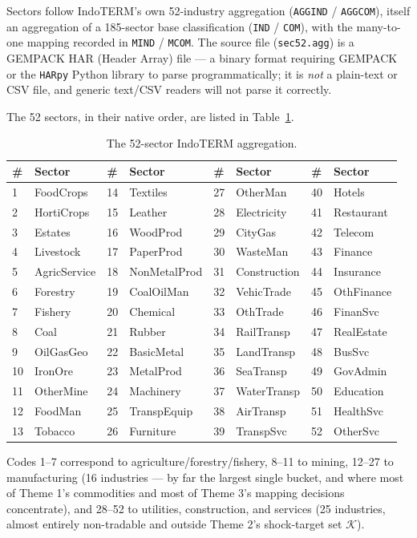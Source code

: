 \documentclass[11pt]{article}
\begin{document}
Sectors follow IndoTERM's own 52-industry aggregation (\texttt{AGGIND} /
\texttt{AGGCOM}), itself an aggregation of a 185-sector base classification
(\texttt{IND} / \texttt{COM}), with the many-to-one mapping recorded in
\texttt{MIND} / \texttt{MCOM}. The source file (\texttt{sec52.agg}) is a
GEMPACK HAR (Header Array) file --- a binary format requiring GEMPACK or the
\texttt{HARpy} Python library to parse programmatically; it is \emph{not} a
plain-text or CSV file, and generic text/CSV readers will not parse it
correctly.

The 52 sectors, in their native order, are listed in
Table~\ref{tab:sector52}.

\begin{longtable}{@{}p{0.6cm}p{2.8cm}p{0.6cm}p{2.8cm}p{0.6cm}p{2.8cm}p{0.6cm}p{2.8cm}@{}}
\caption{The 52-sector IndoTERM aggregation.}
\label{tab:sector52} \\
\toprule
\# & Sector & \# & Sector & \# & Sector & \# & Sector \\
\midrule
\endhead
1 & FoodCrops & 14 & Textiles & 27 & OtherMan & 40 & Hotels \\
2 & HortiCrops & 15 & Leather & 28 & Electricity & 41 & Restaurant \\
3 & Estates & 16 & WoodProd & 29 & CityGas & 42 & Telecom \\
4 & Livestock & 17 & PaperProd & 30 & WasteMan & 43 & Finance \\
5 & AgricService & 18 & NonMetalProd & 31 & Construction & 44 & Insurance \\
6 & Forestry & 19 & CoalOilMan & 32 & VehicTrade & 45 & OthFinance \\
7 & Fishery & 20 & Chemical & 33 & OthTrade & 46 & FinanSvc \\
8 & Coal & 21 & Rubber & 34 & RailTransp & 47 & RealEstate \\
9 & OilGasGeo & 22 & BasicMetal & 35 & LandTransp & 48 & BusSvc \\
10 & IronOre & 23 & MetalProd & 36 & SeaTransp & 49 & GovAdmin \\
11 & OtherMine & 24 & Machinery & 37 & WaterTransp & 50 & Education \\
12 & FoodMan & 25 & TranspEquip & 38 & AirTransp & 51 & HealthSvc \\
13 & Tobacco & 26 & Furniture & 39 & TranspSvc & 52 & OtherSvc \\
\bottomrule
\end{longtable}

\noindent Codes 1--7 correspond to agriculture/forestry/fishery, 8--11 to
mining, 12--27 to manufacturing (16 industries --- by far the largest single
bucket, and where most of Theme 1's commodities and most of Theme 3's
mapping decisions concentrate), and 28--52 to utilities, construction, and
services (25 industries, almost entirely non-tradable and outside Theme 2's
shock-target set $\mathcal{K}$).
\end{document}
